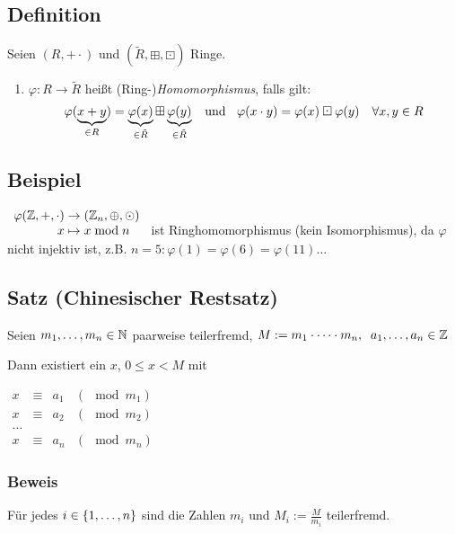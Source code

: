 \subsection[Definition: Homomorphismus, Isomorphismus]{Definition}

Seien $(R, + \cdot)$ und $(\tilde{R}, \boxplus, \boxdot)$ Ringe.

{\renewcommand{\labelenumi}{(\roman{enumi})}
\begin{enumerate}
	\item
	$\varphi: R \to \tilde{R}$ heißt (Ring-)\emph{Homomorphismus}, falls gilt:
	\[\varphi(\underbrace{x+y}_{\in R}) = \underbrace{\varphi(x)}_{\in \tilde{R}} \boxplus \underbrace{\varphi(y)}_{\in \tilde{R}}
	\text{\;\; und \;\;}
	\varphi(x \cdot y) = \varphi(x) \boxdot \varphi(y) \quad \forall x, y \in R\]
	
\end{enumerate}}

\subsection{Beispiel}

$\begin{array}[b]{r@{\;}c@{\;}l}
	\varphi(\Z, +, \cdot) &\to&  (\Z_n, \oplus, \odot) \\
	x	&\mapsto& x \mod n 
\end{array}$
ist Ringhomomorphismus (kein Isomorphismus), da $\varphi$ nicht injektiv ist, z.B. $n=5: \varphi(1)= \varphi(6) = \varphi(11) \dots$


\subsection[Satz: Chinesischer Restsatz]{Satz (Chinesischer Restsatz)} \label{chin.restsatz}

Seien $m_1, \dots, m_n \in \mathbb{N}$ paarweise teilerfremd,
$M := m_1 \cdot \dots \cdot m_n, \;\; a_1, \dots, a_n \in \mathbb{Z}$

Dann existiert ein $x$, $0 \leq x < M$ mit 

$\begin{array}{lcll}
x &\equiv& a_1	& (\mod m_1) \\
x &\equiv& a_2	& (\mod m_2) \\
\dots \\
x &\equiv& a_n	& (\mod m_n)
\end{array}$


\subsubsection*{Beweis}
Für jedes $i \in \left\{1, \dots, n\right\}$ sind die Zahlen $m_i$ und $M_i := \frac{M}{m_i}$ teilerfremd.

